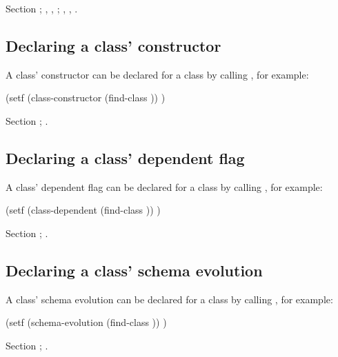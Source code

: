  Section ;
,
,
; ,
, .

\subsection{Declaring a class' constructor}

A class' constructor can be declared for a class by calling
, for example:
\begin{IndentedCompactCode}
(setf (class-constructor (find-class )) )
\end{IndentedCompactCode}

 Section ; .

\subsection{Declaring a class' dependent flag}

A class' dependent flag can be declared for a class by calling
, for example:
\begin{IndentedCompactCode}
(setf (class-dependent (find-class )) )
\end{IndentedCompactCode}

 Section ; .

\subsection{Declaring a class' schema evolution}

A class' schema evolution can be declared for a class by calling
, for example:
\begin{IndentedCompactCode}
(setf (schema-evolution (find-class )) )
\end{IndentedCompactCode}

 Section ; .
%
%
%
